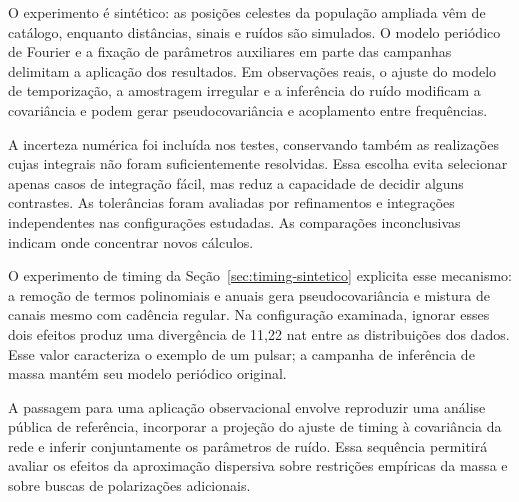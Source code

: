 O experimento é sintético: as posições celestes da população ampliada vêm de catálogo, enquanto distâncias, sinais e ruídos são simulados. O modelo periódico de Fourier e a fixação de parâmetros auxiliares em parte das campanhas delimitam a aplicação dos resultados. Em observações reais, o ajuste do modelo de temporização, a amostragem irregular e a inferência do ruído modificam a covariância e podem gerar pseudocovariância e acoplamento entre frequências.

A incerteza numérica foi incluída nos testes, conservando também as realizações cujas integrais não foram suficientemente resolvidas. Essa escolha evita selecionar apenas casos de integração fácil, mas reduz a capacidade de decidir alguns contrastes. As tolerâncias foram avaliadas por refinamentos e integrações independentes nas configurações estudadas. As comparações inconclusivas indicam onde concentrar novos cálculos.

O experimento de timing da Seção~\ref{sec:timing-sintetico} explicita esse mecanismo: a remoção de termos polinomiais e anuais gera pseudocovariância e mistura de canais mesmo com cadência regular. Na configuração examinada, ignorar esses dois efeitos produz uma divergência de 11,22 nat entre as distribuições dos dados. Esse valor caracteriza o exemplo de um pulsar; a campanha de inferência de massa mantém seu modelo periódico original.

A passagem para uma aplicação observacional envolve reproduzir uma análise pública de referência, incorporar a projeção do ajuste de timing à covariância da rede e inferir conjuntamente os parâmetros de ruído. Essa sequência permitirá avaliar os efeitos da aproximação dispersiva sobre restrições empíricas da massa e sobre buscas de polarizações adicionais.
